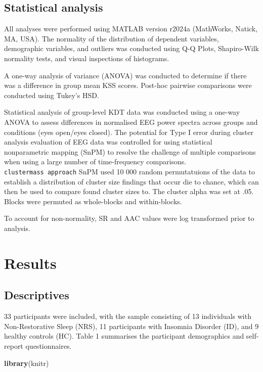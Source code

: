 \documentclass[
]{article}
\newenvironment{Shaded}{\begin{snugshade}}{\end{snugshade}}
\newcommand{\FunctionTok}[1]{\textcolor[rgb]{0.13,0.29,0.53}{\textbf{#1}}}
\newcommand{\NormalTok}[1]{#1}
\begin{document}
\subsection{Statistical analysis}\label{statistical-analysis}

All analyses were performed using MATLAB version r2024a (MathWorks,
Natick, MA, USA). The normality of the distribution of dependent
variables, demographic variables, and outliers was conducted using Q-Q
Plots, Shapiro-Wilk normality tests, and visual inspections of
histograms.

A one-way analysis of variance (ANOVA) was conducted to determine if
there was a difference in group mean KSS scores. Post-hoc pairwise
comparisons were conducted using Tukey's HSD.

Statistical analysis of group-level KDT data was conducted using a
one-way ANOVA to assess differences in normalised EEG power spectra
across groups and conditions (eyes open/eyes closed). The potential for
Type I error during cluster analysis evaluation of EEG data was
controlled for using statistical nonparametric mapping (SnPM) to resolve
the challenge of multiple comparisons when using a large number of
time-frequency comparisons. \texttt{clustermass\ approach} SnPM used 10
000 random permutatuions of the data to establish a distribution of
cluster size findings that occur die to chance, which can then be used
to compare found cluster sizes to. The cluster alpha was set at .05.
Blocks were permuted as whole-blocks and within-blocks.

To account for non-normality, SR and AAC values were log transformed
prior to analysis.

\newpage

\section{Results}\label{sec:results}

\subsection{Descriptives}\label{descriptives}

33 participants were included, with the sample consisting of 13
individuals with Non-Restorative Sleep (NRS), 11 participants with
Insomnia Disorder (ID), and 9 healthy controls (HC). Table 1 summarises
the participant demographics and self-report questionnaires.

\begin{Shaded}
\begin{Highlighting}[]
\FunctionTok{library}\NormalTok{(knitr)}
\end{Highlighting}
\end{Shaded}
\end{document}
